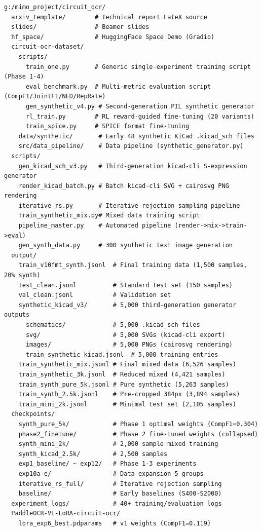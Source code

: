\begin{verbatim}
g:/mimo_project/circuit_ocr/
  arxiv_template/        # Technical report LaTeX source
  slides/                # Beamer slides
  hf_space/              # HuggingFace Space Demo (Gradio)
  circuit-ocr-dataset/
    scripts/
      train_one.py       # Generic single-experiment training script (Phase 1-4)
      eval_benchmark.py  # Multi-metric evaluation script (CompF1/JointF1/NED/RepRate)
      gen_synthetic_v4.py # Second-generation PIL synthetic generator
      rl_train.py        # RL reward-guided fine-tuning (20 variants)
      train_spice.py     # SPICE format fine-tuning
    data/synthetic/       # Early 48 synthetic KiCad .kicad_sch files
    src/data_pipeline/    # Data pipeline (synthetic_generator.py)
  scripts/
    gen_kicad_sch_v3.py   # Third-generation kicad-cli S-expression generator
    render_kicad_batch.py # Batch kicad-cli SVG + cairosvg PNG rendering
    iterative_rs.py       # Iterative rejection sampling pipeline
    train_synthetic_mix.py# Mixed data training script
    pipeline_master.py    # Automated pipeline (render->mix->train->eval)
    gen_synth_data.py     # 300 synthetic text image generation
  output/
    train_v10fmt_synth.jsonl  # Final training data (1,500 samples, 20% synth)
    test_clean.jsonl          # Standard test set (150 samples)
    val_clean.jsonl           # Validation set
    synthetic_kicad_v3/       # 5,000 third-generation generator outputs
      schematics/             # 5,000 .kicad_sch files
      svg/                    # 5,000 SVGs (kicad-cli export)
      images/                 # 5,000 PNGs (cairosvg rendering)
      train_synthetic_kicad.jsonl  # 5,000 training entries
    train_synthetic_mix.jsonl # Final mixed data (6,526 samples)
    train_synthetic_3k.jsonl  # Reduced mixed (4,421 samples)
    train_synth_pure_5k.jsonl # Pure synthetic (5,263 samples)
    train_synth_2.5k.jsonl    # Pre-cropped 384px (3,894 samples)
    train_mini_2k.jsonl       # Minimal test set (2,105 samples)
  checkpoints/
    synth_pure_5k/            # Phase 1 optimal weights (CompF1=0.304)
    phase2_finetune/          # Phase 2 fine-tuned weights (collapsed)
    synth_mini_2k/            # 2,000 sample mixed training
    synth_kicad_2.5k/         # 2,500 samples
    exp1_baseline/ ~ exp12/   # Phase 1-3 experiments
    exp10a-e/                 # Data expansion 5 groups
    iterative_rs_full/        # Iterative rejection sampling
    baseline/                 # Early baselines (S400-S2000)
  experiment_logs/            # 40+ training/evaluation logs
  PaddleOCR-VL-LoRA-circuit-ocr/
    lora_exp6_best.pdparams   # v1 weights (CompF1=0.119)
\end{verbatim}


